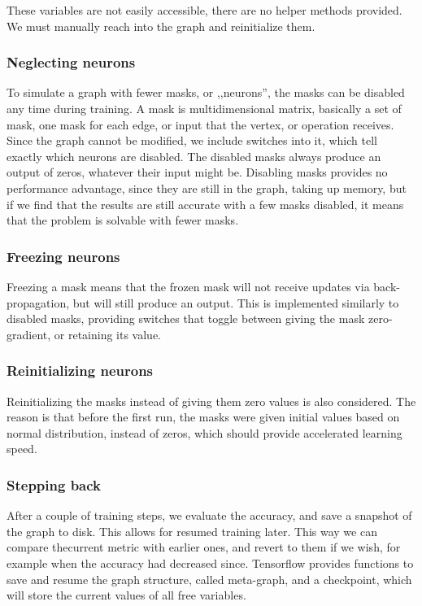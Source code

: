 \documentclass[12pt]{report}
\begin{document}
These variables are not easily accessible, there are no helper methods provided. We must manually reach into the graph and reinitialize them.
\subsubsection{Neglecting neurons}
To simulate a graph with fewer masks, or ,,neurons'', the masks can be disabled any time during training. A mask is  multidimensional matrix, basically a set of mask, one mask for each edge, or input that the vertex, or operation receives. Since the graph cannot be modified, we include switches into it, which tell exactly which neurons are disabled. The disabled masks always produce an output of zeros, whatever their input might be. Disabling masks provides no performance advantage, since they are still in the graph, taking up memory, but if we find that the results are still accurate with a few masks disabled, it means that the problem is solvable with fewer masks.
\subsubsection{Freezing neurons}
Freezing a mask means that the frozen mask will not receive updates via back-propagation, but will still produce an output. This is implemented similarly to disabled masks, providing switches that toggle between giving the mask zero-gradient, or retaining its value.
\subsubsection{Reinitializing neurons}
Reinitializing the masks instead of giving them zero values is also considered. The reason is that before the first run, the masks were given initial values based on normal distribution, instead of zeros, which should provide accelerated learning speed.
\subsubsection{Stepping back}
After a couple of training steps, we evaluate the accuracy, and save a snapshot of the graph to disk. This allows for resumed training later. This way we can compare thecurrent metric with earlier ones, and revert to them if we wish, for example when the accuracy had decreased since. Tensorflow provides functions to save and resume the graph structure, called meta-graph, and a checkpoint, which will store the current values of all free variables.
\end{document}
